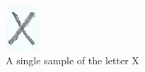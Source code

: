 \documentclass[conference]{IEEEtran}
\begin{document}
\begin{figure}[h]
     \centering
     \begin{subfigure}[b]{0.15\textwidth}
         \centering
         \includegraphics[width=\textwidth]{tem1}
         \caption{A single sample of the letter X}
         \label{fig:tem1}
     \end{subfigure}
     \hfill
     \begin{subfigure}[b]{0.15\textwidth}
         \centering

\end{subfigure}
\end{figure}
\end{document}

